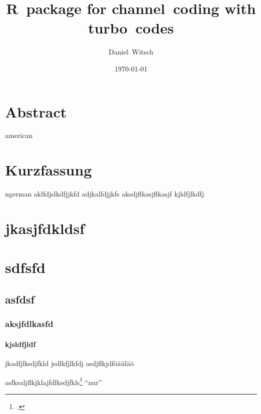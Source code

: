 \documentclass[germanthesis]{thesis-style}
\begin{document}
\author{Daniel~Witsch}
\title{R~package for channel~coding with turbo~codes}
\date{\today}

\maketitle
\abstract{}
\tableofcontents

\chapter*{Abstract}
\begin{otherlanguage*}{american}
\end{otherlanguage*}

\chapter*{Kurzfassung}
\begin{otherlanguage*}{ngerman}
aklfdjslkdfjjkfd 
adjkalfdjjkfs
aksdjflkasjflkasjf
kjldfjlkdfj
\end{otherlanguage*}
\acresetall%

\chapter{jkasjfdkldsf}
\chapter{sdfsfd}
\section{asfdsf}
\subsection{aksjfdlkasfd}
\subsubsection{kjsldfjldf}
jkadfjlksdjfkld
jsdlkfjlkfdj
asdjflkjdföäüläö

%
asfksaljflkjklajfdlksdjfkls\footcite[22]{Angehrn:Chaos}
\cite{Angehrn:Chaos}
\enquote{nur}
\cleardoublepage%

\listofabbreviations
\clearpage

\listoffigures
\clearpage

\listoftables
\clearpage

%
\printbibliography
\end{document}
